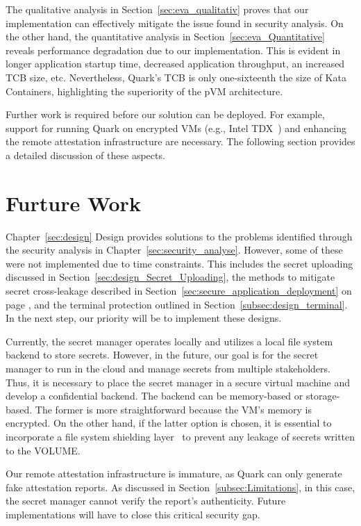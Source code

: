 The qualitative analysis in Section~\ref{sec:eva_qualitativ} proves that our implementation can effectively mitigate the issue found in security analysis. On the other hand, the quantitative analysis in Section~\ref{sec:eva_Quantitative} reveals performance degradation due to our implementation. This is evident in longer application startup time, 
decreased application throughput, an increased \acrshort{TCB} size, etc. Nevertheless, Quark's  \acrshort{TCB} is only one-sixteenth the size of Kata Containers\cite*{Kata-Containers}, highlighting the superiority of the \acrshort{pVM} architecture.
 
Further work is required before our solution can be deployed. For example, support for running Quark on encrypted VMs (e.g., Intel TDX~\cite*{Intel_tdx_whitepaper}) and enhancing the remote attestation infrastructure are necessary. The following section provides a detailed discussion of these aspects.


\section{Furture Work}

Chapter~\ref{sec:design} Design provides solutions to the problems identified through the security analysis in Chapter~\ref{sec:security_analyse}. However, some of these were not implemented due to time constraints. This includes the secret uploading discussed in Section~\ref{sec:design_Secret_Uploading}, the methods to 
mitigate secret cross-leakage described in Section~\ref{sec:secure_application_deployment} on page \pageref{eq:1}, and the terminal protection outlined in Section~\ref{subsec:design_terminal}. In the next step, our priority will be to implement these designs.

Currently, the secret manager operates locally and utilizes a local file system backend to store secrets. However, in the future, our goal is for the secret manager to run in the cloud and manage secrets from multiple stakeholders. Thus, it is necessary to place the secret manager in a secure virtual 
machine and develop a confidential backend. The backend can be memory-based or storage-based. The former is more straightforward because the VM's memory is encrypted. On the other hand, if the latter option is chosen, it is essential to incorporate a file system shielding layer~\cite*{file_system_shield} to prevent any leakage 
of secrets written to the VOLUME.

Our remote attestation infrastructure is immature, as Quark can only generate fake attestation reports. As discussed in Section~\ref{subsec:Limitations}, in this case, the secret manager cannot verify the report's authenticity. Future implementations will have to close this critical security 
gap.

